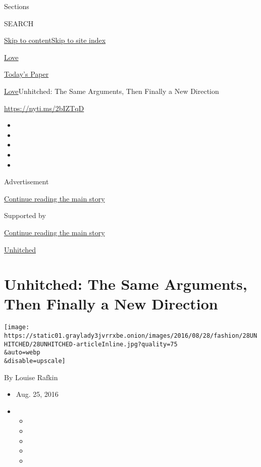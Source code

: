 Sections

SEARCH

\protect\hyperlink{site-content}{Skip to
content}\protect\hyperlink{site-index}{Skip to site index}

\href{https://www.nytimes3xbfgragh.onion/section/fashion/weddings}{Love}

\href{https://myaccount.nytimes3xbfgragh.onion/auth/login?response_type=cookie\&client_id=vi}{}

\href{https://www.nytimes3xbfgragh.onion/section/todayspaper}{Today's
Paper}

\href{/section/fashion/weddings}{Love}\textbar{}Unhitched: The Same
Arguments, Then Finally a New Direction

\url{https://nyti.ms/2bIZTqD}

\begin{itemize}
\item
\item
\item
\item
\item
\end{itemize}

Advertisement

\protect\hyperlink{after-top}{Continue reading the main story}

Supported by

\protect\hyperlink{after-sponsor}{Continue reading the main story}

\href{/column/unhitched}{Unhitched}

\hypertarget{unhitched-the-same-arguments-then-finally-a-new-direction}{%
\section{Unhitched: The Same Arguments, Then Finally a New
Direction}\label{unhitched-the-same-arguments-then-finally-a-new-direction}}

\texttt{[image: https://static01.graylady3jvrrxbe.onion/images/2016/08/28/fashion/28UNHITCHED/28UNHITCHED-articleInline.jpg?quality=75\\\&auto=webp\\\&disable=upscale]}

By Louise Rafkin

\begin{itemize}
\item
  Aug. 25, 2016
\item
  \begin{itemize}
  \item
  \item
  \item
  \item
  \item
  \end{itemize}
\end{itemize}

